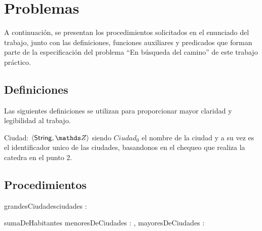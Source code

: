 \documentclass[10pt,a4paper]{article}
\newcommand{\ciudad}{\ensuremath{\langle \mathsf{String} , \ent \rangle}}
\begin{document}
\maketitle

\section{Problemas}
A continuación, se presentan los procedimientos solicitados en el enunciado del trabajo, junto con las definiciones, funciones auxiliares y predicados que forman parte de la especificación del problema ``En búsqueda del camino'' de este trabajo práctico.

\subsection{Definiciones}
Las siguientes definiciones se utilizan para proporcionar mayor claridad y legibilidad al trabajo.

Ciudad:  \ciudad \; siendo $Ciudad_0$ el nombre de la ciudad y a su vez es el identificador unico de las ciudades, basandonos en el chequeo que realiza la catedra en el punto 2.


\subsection{Procedimientos}


\begin{proc}{grandesCiudades}{\In ciudades : }{ }
\end{proc}

\begin{proc}{sumaDeHabitantes}
	{\In menoresDeCiudades : , \In mayoresDeCiudades : }{ }

\end{proc}
\end{document}
